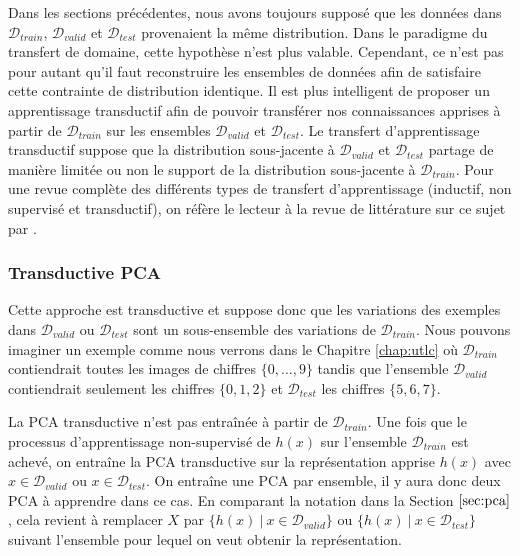 Dans les sections précédentes, nous avons toujours supposé que les données dans
$\mathcal{D}_{train}$, $\mathcal{D}_{valid}$ et $\mathcal{D}_{test}$
provenaient la même distribution. Dans le paradigme du transfert de domaine,
cette hypothèse n'est plus valable. Cependant, ce n'est pas pour autant qu'il
faut reconstruire les ensembles de données afin de satisfaire cette
contrainte de distribution identique. Il est plus intelligent de proposer un
apprentissage transductif afin de pouvoir transférer nos connaissances apprises
à partir de $\mathcal{D}_{train}$ sur les ensembles $\mathcal{D}_{valid}$ et
$\mathcal{D}_{test}$. Le transfert d'apprentissage transductif suppose que la
distribution sous-jacente à $\mathcal{D}_{valid}$ et $\mathcal{D}_{test}$
partage de manière limitée ou non le support de la distribution sous-jacente à
$\mathcal{D}_{train}$. Pour une revue complète des différents types de
transfert d'apprentissage (inductif, non supervisé et transductif), on réfère
le lecteur à la revue de littérature sur ce sujet par \citep{Pan-transfer}.

\subsubsection{Transductive PCA}

Cette approche est transductive et suppose donc que les variations des exemples
dans $\mathcal{D}_{valid}$ ou $\mathcal{D}_{test}$ sont un sous-ensemble des
variations de $\mathcal{D}_{train}$.  Nous pouvons imaginer un exemple comme
nous verrons dans le Chapitre \ref{chap:utlc} où $\mathcal{D}_{train}$
contiendrait toutes les images de chiffres $\lbrace 0,\dots,9 \rbrace$ tandis
que l'ensemble $\mathcal{D}_{valid}$ contiendrait seulement les chiffres
$\lbrace 0,1,2 \rbrace$ et $\mathcal{D}_{test}$ les chiffres $\lbrace 5,6,7
\rbrace$.

La PCA transductive n'est pas entraînée à partir de $\mathcal{D}_{train}$. Une
fois que le processus d'apprentissage non-supervisé de $h(x)$ sur l'ensemble
$\mathcal{D}_{train}$ est achevé, on entraîne la PCA transductive sur la
représentation apprise $h(x)$ avec $x\in\mathcal{D}_{valid}$ ou
$x\in\mathcal{D}_{test}$. On entraîne une PCA par ensemble, il y aura donc deux
PCA à apprendre dans ce cas. En comparant la notation dans la Section $\ref{sec:pca}$, cela
revient à remplacer $X$ par $\lbrace h(x)~|~x\in\mathcal{D}_{valid}\rbrace$ ou
$\lbrace h(x)~|~x\in\mathcal{D}_{test}\rbrace$ suivant l'ensemble pour lequel
on veut obtenir la représentation.

